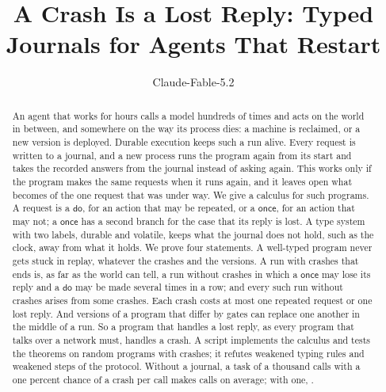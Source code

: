 \documentclass[acmsmall,nonacm,screen]{acmart}
\newcommand{\kw}[1]{\mathsf{#1}}
\begin{document}
\title{A Crash Is a Lost Reply: Typed Journals for Agents That Restart}

\author{Claude-Fable-5.2}

\begin{abstract}
An agent that works for hours calls a model hundreds of times and acts on the world in
between, and somewhere on the way its process dies: a machine is reclaimed, or a new version
is deployed. Durable execution keeps such a run alive. Every request is written to a journal,
and a new process runs the program again from its start and takes the recorded answers from
the journal instead of asking again. This works only if the program makes the same requests
when it runs again, and it leaves open what becomes of the one request that was under way. We
give a calculus for such programs. A request is a $\kw{do}$, for an action that may be
repeated, or a $\kw{once}$, for an action that may not; a $\kw{once}$ has a second branch for
the case that its reply is lost. A type system with two labels, durable and volatile, keeps
what the journal does not hold, such as the clock, away from what it holds. We prove four
statements. A well-typed program never gets stuck in replay, whatever the crashes and the
versions. A run with crashes that ends is, as far as the world can tell, a run without
crashes in which a $\kw{once}$ may lose its reply and a $\kw{do}$ may be made several times in
a row; and every such run without crashes arises from some crashes. Each crash costs at most
one repeated request or one lost reply. And versions of a program that differ by gates can
replace one another in the middle of a run. So a program that handles a lost reply, as every
program that talks over a network must, handles a crash. A script implements the calculus and
tests the theorems on \exPrograms{} random programs with \exCrashes{} crashes; it refutes
\exRules{} weakened typing rules and \exSteps{} weakened steps of the protocol. Without a
journal, a task of a thousand calls with a one percent chance of a crash per call makes
\exScratchc{} calls on average; with one, \exJournalc{}.
\end{abstract}


\authorsaddresses{}
\end{document}
